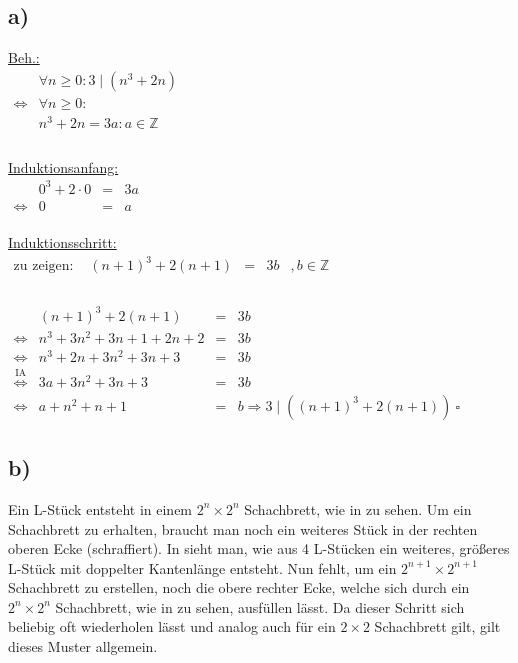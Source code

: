 \documentclass[a4paper]{scrartcl}
\newcommand{\qed}{\ \square}
\begin{document}
	\subsection{a)}
		\underline{Beh.:}\\
		\(
		\begin{array}{rll}
			&\forall n\geq 0 : 3\mid (n^3+2n) \\
			\Leftrightarrow & \forall n\geq 0: \\
			&n^3+2n = 3a :a\in\mathbb{Z}\\
		\end{array}
		\) \\ \\
		\underline{Induktionsanfang:} \\
		\(		
		\begin{array}{rrcl}
			&0^3+2\cdot 0 &=& 3a \\
			\Leftrightarrow &0&=&a
		\end{array}
		\) \\ \\
		\underline{Induktionsschritt: }\\
		\(
		\begin{array}{rrcll}
			\text{zu zeigen: } & (n+1)^3+2(n+1) &=& 3b&,b\in\mathbb{Z} \\
		\end{array}
		\)\\ \\
		\(
		\begin{array}{rrcll}
			&(n+1)^3+2(n+1)&=&3b \\
			\Leftrightarrow & n^3+3n^2+3n+1+2n+2 &=&3b \\
			\Leftrightarrow & n^3+2n+3n^2+3n+3 &=& 3b \\
			\overset{\text{IA}}{\Leftrightarrow} & 3a+3n^2+3n+3 &=& 3b \\
			\Leftrightarrow & a+n^2+n+1 &=& b\Rightarrow  3\mid ((n+1)^3+2(n+1))\qed
		\end{array}
		\)
		
	\subsection{b)}
		Ein L-Stück entsteht in einem \(2^n\times 2^n\) Schachbrett, wie in  zu sehen.
		Um ein Schachbrett zu erhalten, braucht	man noch ein weiteres Stück in der rechten oberen Ecke 
		(schraffiert).
       	In  sieht man, wie aus 4 L-Stücken ein weiteres, größeres L-Stück mit doppelter 
       	Kantenlänge entsteht. Nun fehlt, um ein \(2^{n+1}\times 2^{n+1}\) Schachbrett zu erstellen, noch 
       	die obere rechter Ecke, welche sich durch ein \(2^n\times 2^n\) Schachbrett, wie in 
       	 zu sehen, ausfüllen lässt. Da dieser Schritt sich beliebig oft wiederholen 
       	lässt und analog auch für ein \(2\times 2\) Schachbrett gilt, gilt dieses Muster allgemein.
        
\end{document}
